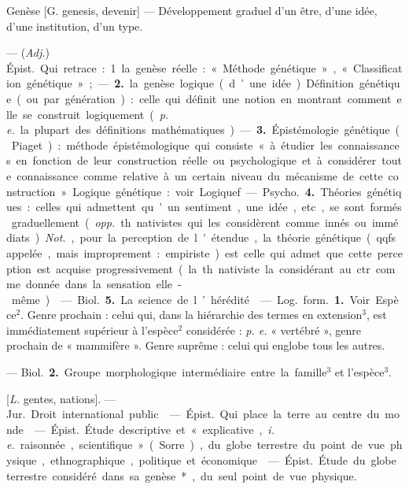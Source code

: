 \begin{itemize}[leftmargin=1cm, label=, itemsep=1pt]
\ib{}Genèse [G. genesis, devenir] — Développement graduel d’un être,
d’une idée, d’une institution, d’un
type.

 — ({\it Adj.}) \si{Épist.} Qui retrace :
1. la genèse réelle : « Méthode génétique », « Classification génétique »;
— {\bf 2.} la genèse logique (d’une idée).
Définition génétique (ou par génération) : celle qui définit une notion
en montrant comment elle se construit logiquement ({\it p. e.} la plupart
des définitions mathématiques). — {\bf 3.} Épistémologie génétique (Piaget) : méthode
épistémologique qui consiste « à
étudier les connaissances en fonction de leur construction réelle ou
psychologique et à considérer toute
connaissance comme relative à un
certain niveau du mécanisme de
cette construction ». Logique génétique : voir Logiquef.

— \si{Psycho.} {\bf 4.} Théories génétiques : celles qui admettent qu’un
sentiment, une idée, etc., se sont
formés graduellement ({\it opp.} th. nativistes qui les considèrent comme
innés ou immédiats). {\it Not.}, pour la
perception de l'étendue, la théorie
génétique (qqfs. appelée, mais improprement : empiriste) est celle qui
admet que cette perception est
acquise progressivement (la th. nativiste la considérant au ctr. comme
donnée dans la sensation elle-même).

 — \si{Biol.} {\bf 5.} La science
de l’hérédité.

 — \si{Log.} \si{form.} {\bf 1.} Voir Espèce$^2$.
Genre prochain : celui qui, dans la
hiérarchie des termes en extension$^3$,
est immédiatement supérieur à l’espèce$^2$ considérée : {\it p. e.} « vertébré »,
genre prochain de « mammifère ».
Genre suprême : celui qui englobe
tous les autres.

— \si{Biol.} {\bf 2.} Groupe morphologique intermédiaire entre la famille$^3$
et l'espèce$^3$.

 [{\it L.} gentes, nations].
— \si{Jur.} Droit international public.

 — \si{Épist.} Qui place la
terre au centre du monde.

 — \si{Épist.} Étude descriptive et « explicative, {\it i. e.} raisonnée,
scientifique » (Sorre), du globe terrestre du point de vue physique,
ethnographique, politique et économique.

 — \si{Épist.} Étude du globe terrestre considéré dans sa genèse*,
du seul point de vue physique.


\end{itemize}
